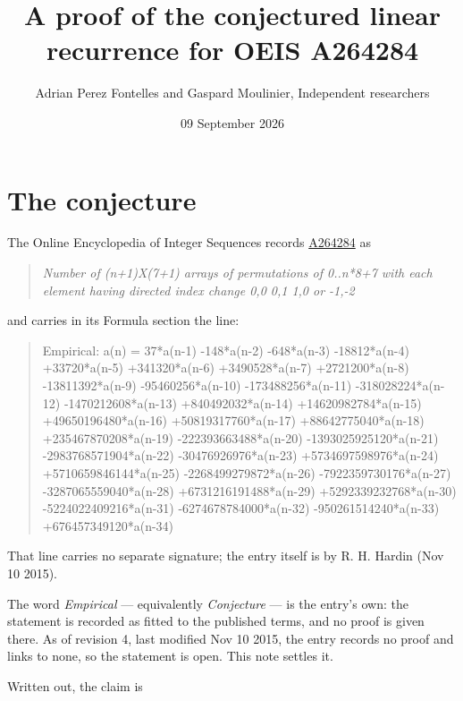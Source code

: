 \documentclass[11pt]{article}
\title{A proof of the conjectured linear recurrence for OEIS A264284}
\author{Adrian Perez Fontelles and Gaspard Moulinier, Independent researchers}
\date{09 September 2026}
\theoremstyle{definition}
\begin{document}
\maketitle
\section{The conjecture}

The Online Encyclopedia of Integer Sequences records \href{https://oeis.org/A264284}{A264284} as

\begin{quote}\itshape Number of (n+1)X(7+1) arrays of permutations of 0..n*8+7 with each element having directed index change 0,0 0,1 1,0 or -1,-2\end{quote}

and carries in its Formula section the line:

\begin{quote}\ttfamily Empirical: a(n) = 37*a(n-1) -148*a(n-2) -648*a(n-3) -18812*a(n-4) +33720*a(n-5) +341320*a(n-6) +3490528*a(n-7) +2721200*a(n-8) -13811392*a(n-9) -95460256*a(n-10) -173488256*a(n-11) -318028224*a(n-12) -1470212608*a(n-13) +840492032*a(n-14) +14620982784*a(n-15) +49650196480*a(n-16) +50819317760*a(n-17) +88642775040*a(n-18) +235467870208*a(n-19) -222393663488*a(n-20) -1393025925120*a(n-21) -2983768571904*a(n-22) -30476926976*a(n-23) +5734697598976*a(n-24) +5710659846144*a(n-25) -2268499279872*a(n-26) -7922359730176*a(n-27) -3287065559040*a(n-28) +6731216191488*a(n-29) +5292339232768*a(n-30) -5224022409216*a(n-31) -6274678784000*a(n-32) -950261514240*a(n-33) +676457349120*a(n-34)\end{quote}

That line carries no separate signature; the entry itself is by R. H. Hardin (Nov 10 2015).

The word {\itshape Empirical} --- equivalently {\itshape Conjecture} --- is the entry's own: the statement is recorded as fitted to the published terms, and no proof is given there. As of revision 4, last modified Nov 10 2015, the entry records no proof and links to none, so the statement is open. This note settles it.

Written out, the claim is
\end{document}
